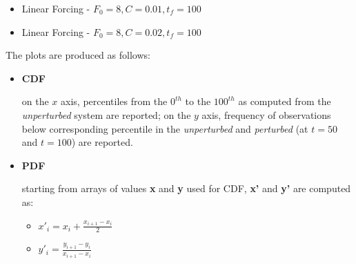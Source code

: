 \documentclass{article}
\begin{document}
\begin{itemize}
	\item Linear Forcing - $F_0=8, C=0.01, t_f=100$
	\item Linear Forcing - $F_0=8, C=0.02, t_f=100$
\end{itemize}
The plots are produced as follows:
\begin{itemize}
	\item \textbf{CDF} 
	
	on the $x$ axis, percentiles from the $0^{th}$ to the $100^{th}$ as computed from the \textit{unperturbed} system are reported; on the $y$ axis, frequency of observations below corresponding percentile in the \textit{unperturbed} and \textit{perturbed} (at $t=50$ and $t=100$) are reported.
	  
	\item \textbf{PDF}
	
	starting from arrays of values \textbf{x} and \textbf{y} used for CDF, \textbf{x'} and \textbf{y'} are computed as:
	
	\begin{itemize}
		\item $x'_i = x_i + \frac{x_{i+1} - x_i}{2}$
		\item $y'_i = \frac{y_{i+1} - y_i}{x_{i+1} - x_i}$
	\end{itemize}
	
	
\end{itemize}
\end{document}
